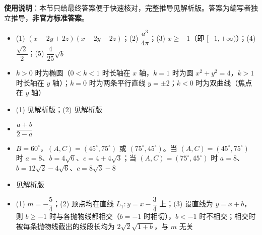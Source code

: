 
\begin{gknotice}
\textbf{使用说明}：本节只给最终答案便于快速核对，完整推导见解析版。答案为编写者独立推导，\textbf{非官方标准答案}。
\end{gknotice}

\begin{itemize}[leftmargin=2.6em]
  \item[\textbf{1.}] (1) $(x-2y+2z)(x-2y-2z)$；(2) $\dfrac{a^3}{4\pi}$；(3) $x\ge-1$（即 $[-1,+\infty)$）；(4) $\dfrac{\sqrt2}{2}$；(5) $\dfrac{4}{25}\sqrt b$
  \item[\textbf{2.}] $k>0$ 时为椭圆（$0<k<1$ 时长轴在 $x$ 轴，$k=1$ 时为圆 $x^2+y^2=4$，$k>1$ 时长轴在 $y$ 轴）；$k=0$ 时为两条平行直线 $y=\pm2$；$k<0$ 时为双曲线（焦点在 $y$ 轴）
  \item[\textbf{3.}] (1) 见解析版；(2) 见解析版
  \item[\textbf{4.}] $\dfrac{a+b}{2-a}$
  \item[\textbf{5.}] $B=60^\circ$，$(A,C)=(45^\circ,75^\circ)$ 或 $(75^\circ,45^\circ)$。当 $(A,C)=(45^\circ,75^\circ)$ 时 $a=8$、$b=4\sqrt6$、$c=4+4\sqrt3$；当 $(A,C)=(75^\circ,45^\circ)$ 时 $a=8$、$b=12\sqrt2-4\sqrt6$、$c=8\sqrt3-8$
  \item[\textbf{6.}] 见解析版
  \item[\textbf{7.}] (1) $m=-\dfrac54$；(2) 顶点均在直线 $L_1:y=x-\dfrac34$ 上；(3) 设直线为 $y=x+b$，则 $b\ge-1$ 时与各抛物线都相交（$b=-1$ 时相切），$b<-1$ 时不相交；相交时被每条抛物线截出的线段长均为 $2\sqrt2\sqrt{1+b}$，与 $m$ 无关
\end{itemize}
